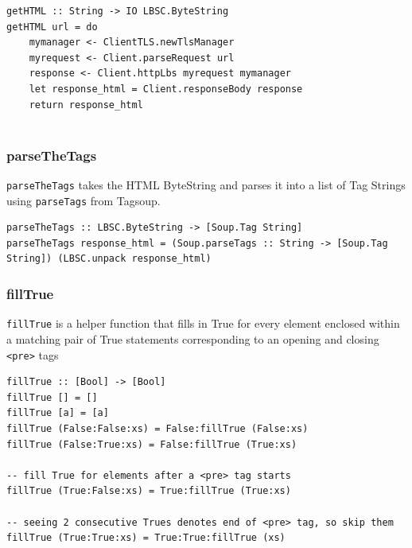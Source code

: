 \documentclass{scrreprt}
\begin{document}
\begin{verbatim}
getHTML :: String -> IO LBSC.ByteString
getHTML url = do
    mymanager <- ClientTLS.newTlsManager
    myrequest <- Client.parseRequest url
    response <- Client.httpLbs myrequest mymanager
    let response_html = Client.responseBody response
    return response_html
    
\end{verbatim}







\subsubsection{parseTheTags}
\texttt{parseTheTags} takes the HTML ByteString and parses it into a list of Tag Strings using \texttt{parseTags} from Tagsoup.

\begin{verbatim}
parseTheTags :: LBSC.ByteString -> [Soup.Tag String]
parseTheTags response_html = (Soup.parseTags :: String -> [Soup.Tag String]) (LBSC.unpack response_html)
\end{verbatim}







\subsubsection{fillTrue}
\texttt{fillTrue} is a helper function that fills in True for every element enclosed within a matching pair of True statements corresponding to an opening and closing \texttt{<pre>} tags

\begin{verbatim}
fillTrue :: [Bool] -> [Bool]
fillTrue [] = []
fillTrue [a] = [a]
fillTrue (False:False:xs) = False:fillTrue (False:xs)
fillTrue (False:True:xs) = False:fillTrue (True:xs)

-- fill True for elements after a <pre> tag starts
fillTrue (True:False:xs) = True:fillTrue (True:xs) 

-- seeing 2 consecutive Trues denotes end of <pre> tag, so skip them
fillTrue (True:True:xs) = True:True:fillTrue (xs) 
\end{verbatim}
\end{document}
